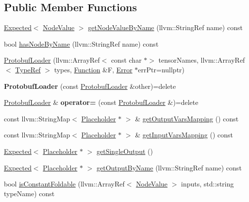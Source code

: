 \subsection*{Public Member Functions}
\begin{DoxyCompactItemize}
\item 
\hyperlink{classglow_1_1detail_1_1_glow_expected}{Expected}$<$ \hyperlink{structglow_1_1_node_value}{Node\+Value} $>$ \hyperlink{classglow_1_1_protobuf_loader_afe06768b43d8aa8398d8d4c0c9668540}{get\+Node\+Value\+By\+Name} (llvm\+::\+String\+Ref name) const
\item 
bool \hyperlink{classglow_1_1_protobuf_loader_a50508e4cbe83b3cafd7d7319199c0fb7}{has\+Node\+By\+Name} (llvm\+::\+String\+Ref name) const
\item 
\hyperlink{classglow_1_1_protobuf_loader_aebda831dd716c8c1056f520783a062ac}{Protobuf\+Loader} (llvm\+::\+Array\+Ref$<$ const char $\ast$$>$ tensor\+Names, llvm\+::\+Array\+Ref$<$ \hyperlink{structglow_1_1_type}{Type\+Ref} $>$ types, \hyperlink{classglow_1_1_function}{Function} \&F, \hyperlink{namespaceglow_afdb176c3a672ef66db0ecfc19a8d39bf}{Error} $\ast$err\+Ptr=nullptr)
\item 
\mbox{\label{classglow_1_1_protobuf_loader_a60f3f978f452dffff98a6dceed704240}} 
{\bfseries Protobuf\+Loader} (const \hyperlink{classglow_1_1_protobuf_loader}{Protobuf\+Loader} \&other)=delete
\item 
\mbox{\label{classglow_1_1_protobuf_loader_a993f1998ae3c5443c5fd5d0905bc0a89}} 
\hyperlink{classglow_1_1_protobuf_loader}{Protobuf\+Loader} \& {\bfseries operator=} (const \hyperlink{classglow_1_1_protobuf_loader}{Protobuf\+Loader} \&)=delete
\item 
const llvm\+::\+String\+Map$<$ \hyperlink{classglow_1_1_placeholder}{Placeholder} $\ast$ $>$ \& \hyperlink{classglow_1_1_protobuf_loader_a7e89514a172bff5eb02915725d26e315}{get\+Output\+Vars\+Mapping} () const
\item 
const llvm\+::\+String\+Map$<$ \hyperlink{classglow_1_1_placeholder}{Placeholder} $\ast$ $>$ \& \hyperlink{classglow_1_1_protobuf_loader_ac07756504a756acf83d49ef59ae1ff2f}{get\+Input\+Vars\+Mapping} () const
\item 
\hyperlink{classglow_1_1detail_1_1_glow_expected}{Expected}$<$ \hyperlink{classglow_1_1_placeholder}{Placeholder} $\ast$ $>$ \hyperlink{classglow_1_1_protobuf_loader_a84d14ec2ce55c5fd11a96fe688435b40}{get\+Single\+Output} ()
\item 
\hyperlink{classglow_1_1detail_1_1_glow_expected}{Expected}$<$ \hyperlink{classglow_1_1_placeholder}{Placeholder} $\ast$ $>$ \hyperlink{classglow_1_1_protobuf_loader_aa74cf67a8dae7eb8c6793aae25589c24}{get\+Output\+By\+Name} (llvm\+::\+String\+Ref name) const
\item 
bool \hyperlink{classglow_1_1_protobuf_loader_a60ed5b8175104dffe27f3f88b45ceede}{is\+Constant\+Foldable} (llvm\+::\+Array\+Ref$<$ \hyperlink{structglow_1_1_node_value}{Node\+Value} $>$ inputs, std\+::string type\+Name) const
\end{DoxyCompactItemize}
